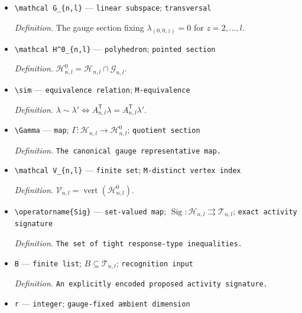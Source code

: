 \documentclass{article}
\begin{document}
\begin{itemize}
  \par\smallskip\noindent\emph{Definition.} \(K_{n,l}=\ker(A_{n,l}^{\mathsf T})\).
  \item \texttt{\textbackslash{}\allowbreak{}mathcal G\_\allowbreak{}\{n,\allowbreak{}l\}\allowbreak{}} --- \texttt{linear subspace}; \texttt{transversal}
  \par\smallskip\noindent\emph{Definition.} The gauge section fixing \(\lambda_{(0,0,z)}=0\) for \(z=2,\ldots,l\).
  \item \texttt{\textbackslash{}\allowbreak{}mathcal H\textasciicircum{}0\_\allowbreak{}\{n,\allowbreak{}l\}\allowbreak{}} --- \texttt{polyhedron}; \texttt{pointed section}
  \par\smallskip\noindent\emph{Definition.} \(\mathcal H^0_{n,l}=\mathcal H_{n,l}\cap\mathcal G_{n,l}\).
  \item \texttt{\textbackslash{}\allowbreak{}sim} --- \texttt{equivalence relation}; \texttt{M-\allowbreak{}equivalence}
  \par\smallskip\noindent\emph{Definition.} \(\lambda\sim\lambda'\Longleftrightarrow A_{n,l}^{\mathsf T}\lambda=A_{n,l}^{\mathsf T}\lambda'\).
  \item \texttt{\textbackslash{}\allowbreak{}Gamma} --- \texttt{map}; \(\Gamma:\mathcal H_{n,l}\to\mathcal H^0_{n,l}\); \texttt{quotient section}
  \par\smallskip\noindent\emph{Definition.} \texttt{The canonical gauge representative map.}
  \item \texttt{\textbackslash{}\allowbreak{}mathcal V\_\allowbreak{}\{n,\allowbreak{}l\}\allowbreak{}} --- \texttt{finite set}; \texttt{M-\allowbreak{}distinct vertex index}
  \par\smallskip\noindent\emph{Definition.} \(\mathcal V_{n,l}=\operatorname{vert}(\mathcal H^0_{n,l})\).
  \item \texttt{\textbackslash{}\allowbreak{}operatorname\{Sig\}\allowbreak{}} --- \texttt{set-\allowbreak{}valued map}; \(\operatorname{Sig}:\mathcal H_{n,l}\rightrightarrows\mathcal T_{n,l}\); \texttt{exact activity signature}
  \par\smallskip\noindent\emph{Definition.} \texttt{The set of tight response-\allowbreak{}type inequalities.}
  \item \texttt{B} --- \texttt{finite list}; \(B\subseteq\mathcal T_{n,l}\); \texttt{recognition input}
  \par\smallskip\noindent\emph{Definition.} \texttt{An explicitly encoded proposed activity signature.}
  \item \texttt{r} --- \texttt{integer}; \texttt{gauge-\allowbreak{}fixed ambient dimension}

\end{itemize}
\end{document}
